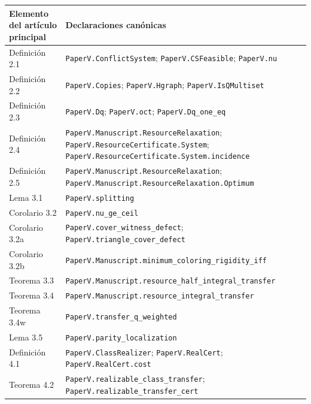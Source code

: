\documentclass[spanish,11pt,a4paper]{article}
\newcounter{none}
\begin{document}
{\def\LTcaptype{none} %
\begin{longtable}[]{@{}
  >{\raggedright\arraybackslash}p{}
  >{\raggedright\arraybackslash}p{}@{}}
\toprule\noalign{}
\begin{minipage}[b]{\linewidth}\raggedright
Elemento del artículo principal
\end{minipage} & \begin{minipage}[b]{\linewidth}\raggedright
Declaraciones canónicas
\end{minipage} \\
\midrule\noalign{}
\endhead
\bottomrule\noalign{}
\endlastfoot
Definición 2.1 & \nolinkurl{PaperV.ConflictSystem};
\texttt{PaperV.CSFeasible}; \texttt{PaperV.nu} \\
Definición 2.2 & \texttt{PaperV.Copies}; \texttt{PaperV.Hgraph};
\nolinkurl{PaperV.IsQMultiset} \\
Definición 2.3 & \texttt{PaperV.Dq}; \texttt{PaperV.oct};
\nolinkurl{PaperV.Dq_one_eq} \\
Definición 2.4 & \nolinkurl{PaperV.Manuscript.ResourceRelaxation};
\nolinkurl{PaperV.ResourceCertificate.System};
\nolinkurl{PaperV.ResourceCertificate.System.incidence} \\
Definición 2.5 & \nolinkurl{PaperV.Manuscript.ResourceRelaxation};
\nolinkurl{PaperV.Manuscript.ResourceRelaxation.Optimum} \\
Lema 3.1 & \texttt{PaperV.splitting} \\
Corolario 3.2 & \nolinkurl{PaperV.nu_ge_ceil} \\
Corolario 3.2a & \nolinkurl{PaperV.cover_witness_defect};
\nolinkurl{PaperV.triangle_cover_defect} \\
Corolario 3.2b &
\nolinkurl{PaperV.Manuscript.minimum_coloring_rigidity_iff} \\
Teorema 3.3 &
\nolinkurl{PaperV.Manuscript.resource_half_integral_transfer} \\
Teorema 3.4 & \nolinkurl{PaperV.Manuscript.resource_integral_transfer} \\
Teorema 3.4w & \nolinkurl{PaperV.transfer_q_weighted} \\
Lema 3.5 & \nolinkurl{PaperV.parity_localization} \\
Definición 4.1 & \nolinkurl{PaperV.ClassRealizer};
\texttt{PaperV.RealCert}; \nolinkurl{PaperV.RealCert.cost} \\
Teorema 4.2 & \nolinkurl{PaperV.realizable_class_transfer};
\nolinkurl{PaperV.realizable_transfer_cert} \\

\end{longtable}}
\end{document}
